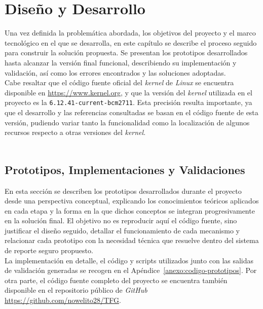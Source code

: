 \chapter{Diseño y Desarrollo}
\label{cap:capitulo5}

Una vez definida la problemática abordada, los objetivos del proyecto y el marco tecnológico en el que se desarrolla, en este capítulo se describe el proceso seguido para construir la solución propuesta.
Se presentan los prototipos desarrollados hasta alcanzar la versión final funcional, describiendo su implementación y validación, así como los errores encontrados y las soluciones adoptadas.\\

Cabe resaltar que el código fuente oficial del \textit{kernel} de \textit{Linux} se encuentra disponible en \url{https://www.kernel.org}, y que la versión del \textit{kernel} utilizada en el proyecto es la \texttt{6.12.41-current-bcm2711}.
Esta precisión resulta importante, ya que el desarrollo y las referencias consultadas se basan en el código fuente de esta versión, pudiendo variar tanto la funcionalidad como la localización de algunos recursos respecto a otras versiones del \textit{kernel}.\\

\

\section{Prototipos, Implementaciones y Validaciones}
\label{sec:prototipos-implementaciones-validaciones}

En esta sección se describen los prototipos desarrollados durante el proyecto desde una perspectiva conceptual, explicando los conocimientos teóricos aplicados en cada etapa y la forma en la que dichos conceptos se integran progresivamente en la solución final.
El objetivo no es reproducir aquí el código fuente, sino justificar el diseño seguido, detallar el funcionamiento de cada mecanismo y relacionar cada prototipo con la necesidad técnica que resuelve dentro del sistema de reporte seguro propuesto.\\

La implementación en detalle, el código y scripts utilizados junto con las salidas de validación generadas se recogen en el Apéndice~\ref{anexo:codigo-prototipos}.
Por otra parte, el código fuente completo del proyecto se encuentra también disponible en el repositorio público de \textit{GitHub} \url{https://github.com/nowelito28/TFG}.\\


